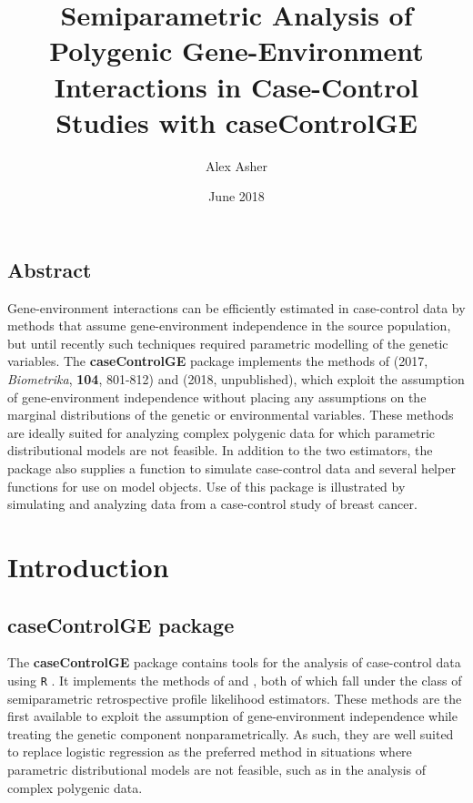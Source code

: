 \documentclass{article}\usepackage[]{graphicx}\usepackage[]{color}
\def\pkg#1{\textbf{#1}}
\def\proglang#1{\texttt{#1}}
\begin{document}
\begin{titlepage}
\author{Alex Asher}
\title{Semiparametric Analysis of Polygenic Gene-Environment Interactions in Case-Control Studies with caseControlGE}
\date{June 2018}
\maketitle
\thispagestyle{empty}

\section*{Abstract}\label{sec:Abstract}
Gene-environment interactions can be efficiently estimated in case-control data by methods that assume gene-environment independence in the source population, but until recently such techniques required parametric modelling of the genetic variables.  The \pkg{caseControlGE} package implements the methods of \citeauthor{Stalder2017} (2017, \emph{Biometrika}, \textbf{104}, 801-812) and \citeauthor{Wang2018unpublished} (2018, unpublished), which exploit the assumption of gene-environment independence without placing any assumptions on the marginal distributions of the genetic or environmental variables.  These methods are ideally suited for analyzing complex polygenic data for which parametric distributional models are not feasible.  In addition to the two estimators, the package also supplies a function to simulate case-control data and several helper functions for use on model objects.  Use of this package is illustrated by simulating and analyzing data from a case-control study of breast cancer.

\end{titlepage}
\newpage

\section{Introduction}

\subsection{caseControlGE package}

The \pkg{caseControlGE} package \citep{Asher2018R} contains tools for the analysis of case-control data using \proglang{R} \citep{R2018}.  It implements the methods of \citet{Stalder2017} and \citet{Wang2018unpublished}, both of which fall under the class of semiparametric retrospective profile likelihood estimators.  These methods are the first available to exploit the assumption of gene-environment independence while treating the genetic component nonparametrically.  As such, they are well suited to replace logistic regression as the preferred method in situations where parametric distributional models are not feasible, such as in the analysis of complex polygenic data.
\end{document}
